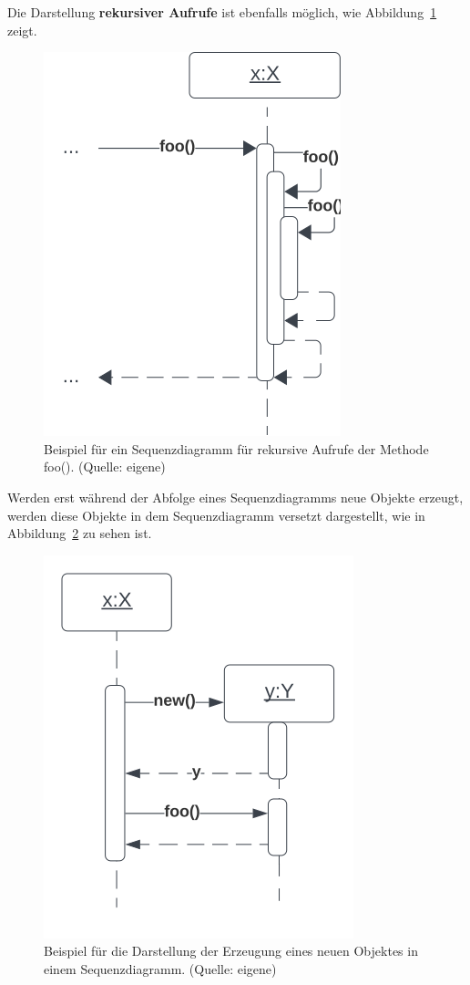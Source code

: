 \noindent
Die Darstellung \textbf{rekursiver Aufrufe} ist ebenfalls möglich, wie Abbildung~\ref{fig:recursion} zeigt.

\begin{figure}
    \centering
    \includegraphics[scale=0.5]{chapters/fopt3/img/recursion}
    \caption{Beispiel für ein Sequenzdiagramm für rekursive Aufrufe der Methode foo(). (Quelle: eigene)}
    \label{fig:recursion}
\end{figure}


\noindent
Werden erst während der Abfolge eines Sequenzdiagramms neue Objekte erzeugt, werden diese Objekte in dem Sequenzdiagramm versetzt dargestellt, wie in Abbildung~\ref{fig:create} zu sehen ist.

\begin{figure}
    \centering
    \includegraphics[scale=0.5]{chapters/fopt3/img/create}
    \caption{Beispiel für die Darstellung der Erzeugung eines neuen Objektes in einem Sequenzdiagramm. (Quelle: eigene)}
    \label{fig:create}
\end{figure}

